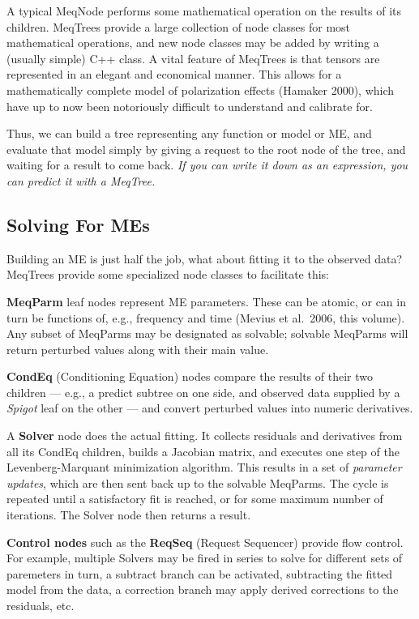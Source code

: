 \documentclass[11pt,twoside]{article}  %
\begin{document}
A typical MeqNode performs some mathematical operation on the results of its
children. MeqTrees provide a large collection of node classes for most
mathematical operations, and new node classes may be added by writing a (usually
simple) C++ class. A vital feature of MeqTrees is that tensors are represented
in an elegant and economical manner. This allows for a mathematically complete
model of polarization effects (Hamaker 2000), which have up to now been
notoriously difficult to understand and calibrate for.

Thus, we can build a tree representing any function or model or ME, and evaluate
that model simply by giving a request to the root node of the tree, and waiting
for a result to come back. {\em If you can write it down as an expression, you
can predict it with a MeqTree.}

\subsection{Solving For MEs}

Building an ME is just half the job, what about fitting it to the observed data?
MeqTrees provide some specialized node classes to facilitate this:

{\bf MeqParm} leaf nodes represent ME parameters. These can be
atomic, or can in turn be functions of, e.g., frequency and time (Mevius et
al.\  2006, this volume). Any subset of MeqParms may be designated as solvable;
solvable MeqParms will return perturbed values along with their main value.

{\bf CondEq} (Conditioning Equation) nodes compare the results of their
two children --- e.g., a predict subtree on one side, and observed data  supplied
by a {\em Spigot} leaf on the other --- and convert perturbed values into numeric
derivatives.

A {\bf Solver} node does the actual fitting. It collects residuals and
derivatives from all its CondEq children, builds a Jacobian matrix, and executes
one step of the Levenberg-Marquant minimization algorithm. This results in a set of {\em
parameter updates}, which are then sent back up to the solvable MeqParms. The
cycle is repeated until a satisfactory fit is reached, or for some maximum
number of iterations. The Solver node then returns a result.

{\bf Control nodes} such as the {\bf ReqSeq} (Request Sequencer) provide flow
control. For example, multiple Solvers may be fired in series to solve for
different sets of paremeters in turn, a subtract branch can be activated,
subtracting the fitted model from the data, a correction branch may apply
derived corrections to the residuals, etc.
\end{document}
